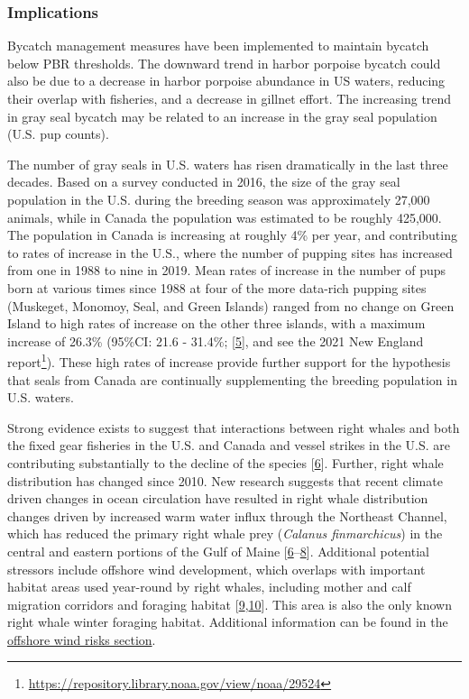 \documentclass[
  10pt,
]{article}
\begin{document}
\hypertarget{implications-5}{%
\subsubsection{Implications}\label{implications-5}}

Bycatch management measures have been implemented to maintain bycatch
below PBR thresholds. The downward trend in harbor porpoise bycatch
could also be due to a decrease in harbor porpoise abundance in US
waters, reducing their overlap with fisheries, and a decrease in gillnet
effort. The increasing trend in gray seal bycatch may be related to an
increase in the gray seal population (U.S. pup counts).

The number of gray seals in U.S. waters has risen dramatically in the
last three decades. Based on a survey conducted in 2016, the size of the
gray seal population in the U.S. during the breeding season was
approximately 27,000 animals, while in Canada the population was
estimated to be roughly 425,000. The population in Canada is increasing
at roughly 4\% per year, and contributing to rates of increase in the
U.S., where the number of pupping sites has increased from one in 1988
to nine in 2019. Mean rates of increase in the number of pups born at
various times since 1988 at four of the more data-rich pupping sites
(Muskeget, Monomoy, Seal, and Green Islands) ranged from no change on
Green Island to high rates of increase on the other three islands, with
a maximum increase of 26.3\% (95\%CI: 21.6 - 31.4\%;
{[}\protect\hyperlink{ref-wood_rates_2020}{5}{]}, and see the 2021 New
England report\footnote{\url{https://repository.library.noaa.gov/view/noaa/29524}}).
These high rates of increase provide further support for the hypothesis
that seals from Canada are continually supplementing the breeding
population in U.S. waters.

Strong evidence exists to suggest that interactions between right whales
and both the fixed gear fisheries in the U.S. and Canada and vessel
strikes in the U.S. are contributing substantially to the decline of the
species {[}\protect\hyperlink{ref-hayes_north_2018}{6}{]}. Further,
right whale distribution has changed since 2010. New research suggests
that recent climate driven changes in ocean circulation have resulted in
right whale distribution changes driven by increased warm water influx
through the Northeast Channel, which has reduced the primary right whale
prey (\emph{Calanus finmarchicus}) in the central and eastern portions
of the Gulf of Maine
{[}\protect\hyperlink{ref-hayes_north_2018}{6}--\protect\hyperlink{ref-sorochan_north_2019}{8}{]}.
Additional potential stressors include offshore wind development, which
overlaps with important habitat areas used year-round by right whales,
including mother and calf migration corridors and foraging habitat
{[}\protect\hyperlink{ref-quintana-rizzo_residency_2021}{9},\protect\hyperlink{ref-schick_striking_2009}{10}{]}.
This area is also the only known right whale winter foraging habitat.
Additional information can be found in the
\protect\hyperlink{other-ocean-uses-offshore-wind}{offshore wind risks
section}.
\end{document}
